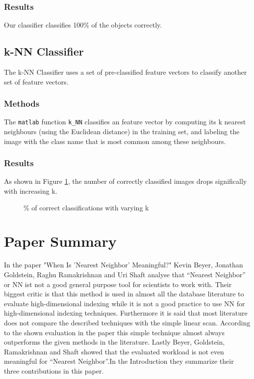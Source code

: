 \documentclass[a4paper,psfig,subfigure,epsfig,fleqn,amssmb,float,caption,fontenc,ausarbeitung]{article}
\begin{document}
\subsubsection{Results}
\label{sec:ownResults}
Our classifier classifies 100\% of the objects correctly.

\subsection{k-NN Classifier}
\label{sec:kNN}
The k-NN Classifier uses a set of pre-classified feature vectors to classify another set of feature vectors.

\subsubsection{Methods}
\label{sec:kNNMethods}
The {\tt matlab} function {\tt k\_NN} classifies an feature vector by computing its k nearest neighbours (using the Euclidean distance) in the training set, and labeling the image with the class name that is most common among these neighbours.

\subsubsection{Results}
\label{sec:kNNResults}
As shown in Figure \ref{fig:results}, the number of correctly classified images drops significally with increasing k.
\begin{figure}
	\centering
	\setlength\figureheight{7cm} 
	\setlength\figurewidth{9cm}
	
	\caption{\% of correct classifications with varying k}
	\label{fig:results}
\end{figure}

\section{Paper Summary}
\label{sec:paperSummary}
 \cite{beyer1999nearest}

In the paper "When Is 'Nearest Neighbor' Meaningful?" Kevin Beyer, Jonathan Goldstein, Raghu Ramakrishnan and Uri Shaft analyse that “Nearest Neighbor” or NN ist not a good general purpose tool for scientists to work with. Their biggest critic is that this method is used in almost all the database literature to evaluate high-dimensional indexing while it is not a good practice to use NN for high-dimensional indexing techniques. Furthermore it is said that most literature does not compare the described techniques with the simple linear scan. According to the shown evaluation in the paper this simple technique almost always outperforms the given methods in the literature. Lastly Beyer, Goldstein, Ramakrishnan and Shaft showed that the evaluated workload is not even meaningful for “Nearest Neighbor”.In the Introduction they summarize their three contributions in this paper. 
\end{document}
